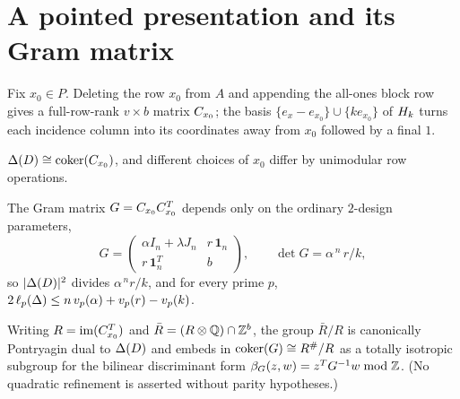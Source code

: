 \section{A pointed presentation and its Gram matrix}

Fix $x_0\in P$. Deleting the row $x_0$ from $A$ and appending the all-ones
block row gives a full-row-rank $v\times b$ matrix $C_{x_0}$; the basis
$\{e_x-e_{x_0}\}\cup\{k e_{x_0}\}$ of $H_k$ turns each incidence column into its
coordinates away from $x_0$ followed by a final $1$.

\begin{proposition}\label{prop:gp}
$\Delta(D)\cong\operatorname{coker}(C_{x_0})$, and different choices of $x_0$ differ by unimodular
row operations.

The Gram matrix $G=C_{x_0}C_{x_0}^{T}$ depends only on the ordinary
$2$-design parameters,
\[
G=\begin{pmatrix}\alpha I_{n}+\lambda J_{n} & r\,\mathbf 1_n\\
r\,\mathbf 1_n^{T} & b\end{pmatrix},\qquad
\det G=\alpha^{\,n}\,r/k,
\]
so $|\Delta(D)|^{2}$ divides $\alpha^{\,n}r/k$, and for every prime $p$,
$2\,\ell_p(\Delta)\le n\,v_p(\alpha)+v_p(r)-v_p(k)$.

Writing $R=\operatorname{im}(C_{x_0}^{T})$ and
$\bar R=(R\otimes\mathbb{Q})\cap\mathbb{Z}^{b}$, the group $\bar R/R$ is canonically
Pontryagin dual to $\Delta(D)$ and embeds in $\operatorname{coker}(G)\cong R^{\#}/R$ as a
totally isotropic subgroup for the bilinear discriminant form
$\beta_G(z,w)=z^{T}G^{-1}w\bmod\mathbb{Z}$. \textup(No quadratic refinement is asserted
without parity hypotheses.\textup)
\end{proposition}

